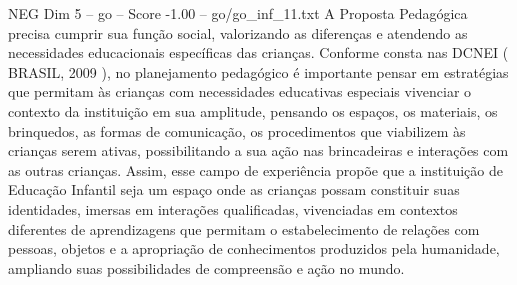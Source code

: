 \begin{textsample}{NEG Dim 5 – go – Score -1.00 – go/go\_inf\_11.txt}
A Proposta Pedagógica precisa cumprir sua função social, valorizando as diferenças e atendendo as necessidades educacionais específicas das crianças.
Conforme consta nas DCNEI ( BRASIL, 2009 ), no planejamento pedagógico é importante pensar em estratégias que permitam às crianças com necessidades educativas especiais vivenciar o contexto da instituição em sua amplitude, pensando os espaços, os materiais, os brinquedos, as formas de comunicação, os procedimentos que viabilizem às crianças serem ativas, possibilitando a sua ação nas brincadeiras e interações com as outras crianças.
Assim, esse campo de experiência propõe que a instituição de Educação Infantil seja um espaço onde as crianças possam constituir suas identidades, imersas em interações qualificadas, vivenciadas em contextos diferentes de aprendizagens que permitam o estabelecimento de relações com pessoas, objetos e a apropriação de conhecimentos produzidos pela humanidade, ampliando suas possibilidades de compreensão e ação no mundo.

\end{textsample}
